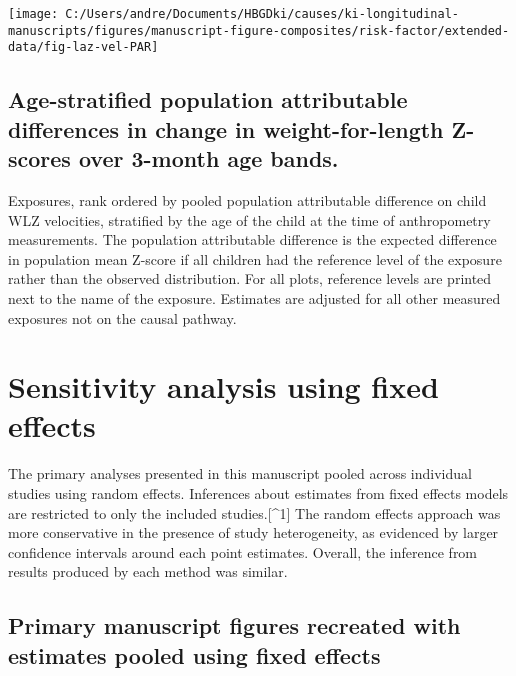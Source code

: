 \documentclass[
  9pt,
]{book}
\begin{document}
\texttt{[image: C:/Users/andre/Documents/HBGDki/causes/ki-longitudinal-manuscripts/figures/manuscript-figure-composites/risk-factor/extended-data/fig-laz-vel-PAR]}

\hypertarget{age-stratified-population-attributable-differences-in-change-in-weight-for-length-z-scores-over-3-month-age-bands.}{%
\section{Age-stratified population attributable differences in change in weight-for-length Z-scores over 3-month age bands.}\label{age-stratified-population-attributable-differences-in-change-in-weight-for-length-z-scores-over-3-month-age-bands.}}

Exposures, rank ordered by pooled population attributable difference on child WLZ velocities, stratified by the age of the child at the time of anthropometry measurements. The population attributable difference is the expected difference in population mean Z-score if all children had the reference level of the exposure rather than the observed distribution. For all plots, reference levels are printed next to the name of the exposure. Estimates are adjusted for all other measured exposures not on the causal pathway.

\hypertarget{fixed-effects}{%
\chapter{Sensitivity analysis using fixed effects}\label{fixed-effects}}

\raggedright

The primary analyses presented in this manuscript pooled across individual studies using random effects. Inferences about estimates from fixed effects models are restricted to only the included studies.{[}\^{}1{]} The random effects approach was more conservative in the presence of study heterogeneity, as evidenced by larger confidence intervals around each point estimates. Overall, the inference from results produced by each method was similar.

\hypertarget{primary-manuscript-figures-recreated-with-estimates-pooled-using-fixed-effects}{%
\section{Primary manuscript figures recreated with estimates pooled using fixed effects}\label{primary-manuscript-figures-recreated-with-estimates-pooled-using-fixed-effects}}
\end{document}
